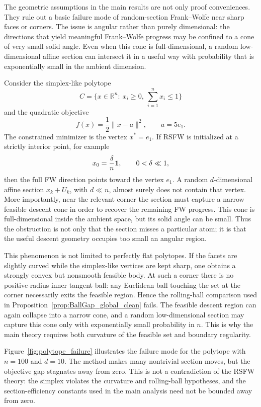 \documentclass{article}
\begin{document}
The geometric assumptions in the main results are not only proof conveniences.
They rule out a basic failure mode of random-section Frank--Wolfe near sharp
faces or corners. The issue is angular rather than purely dimensional: the
directions that yield meaningful Frank--Wolfe progress may be confined to a
cone of very small solid angle. Even when this cone is full-dimensional, a
random low-dimensional affine section can intersect it in a useful way with
probability that is exponentially small in the ambient dimension.

Consider the simplex-like polytope
\[
C=\{x\in\mathbb R^n:\ x_i\ge 0,\ \sum_{i=1}^n x_i\le 1\}
\]
and the quadratic objective
\[
f(x)=\frac12\|x-a\|^2,
\qquad
a=5e_1 .
\]
The constrained minimizer is the vertex \(x^*=e_1\). If RSFW is initialized at
a strictly interior point, for example
\[
x_0=\frac{\delta}{n}{\bf 1},
\qquad
0<\delta\ll1,
\]
then the full FW direction points toward the vertex \(e_1\). A random
\(d\)-dimensional affine section \(x_k+U_k\), with \(d\ll n\), almost surely
does not contain that vertex. More importantly, near the relevant corner the
section must capture a narrow feasible descent cone in order to recover the
remaining FW progress. This cone is full-dimensional inside the ambient space,
but its solid angle can be small. Thus the obstruction is not only
that the section misses a particular atom; it is that the useful descent
geometry occupies too small an angular region.

This phenomenon is not limited to perfectly flat polytopes. If the facets are
slightly curved while the simplex-like vertices are kept sharp, one obtains a
strongly convex but nonsmooth feasible body. At such a corner there is no
positive-radius inner tangent ball: any Euclidean ball touching the set at the
corner necessarily exits the feasible region. Hence the rolling-ball comparison
used in Proposition~\ref{prop:BallGap_global_clean} fails. The feasible descent
region can again collapse into a narrow cone, and a random low-dimensional
section may capture this cone only with exponentially small probability in
\(n\). This is why the main theory requires both curvature of the feasible set
and boundary regularity.

Figure~\ref{fig:polytope_failure} illustrates the failure mode for the polytope
with \(n=100\) and \(d=10\). The method makes many nontrivial section moves, but
the objective gap stagnates away from zero. This is not a contradiction of the
RSFW theory: the simplex violates the curvature and rolling-ball hypotheses,
and the section-efficiency constants used in the main analysis need not be
bounded away from zero.
\end{document}
